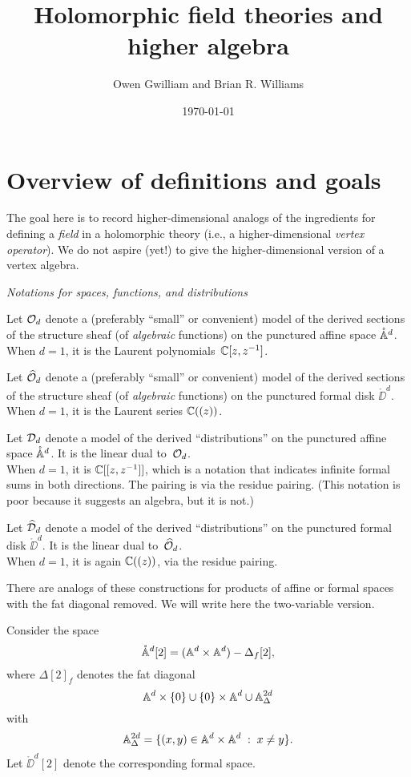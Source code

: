 \documentclass[11pt]{amsart}
\author{Owen Gwilliam and Brian R. Williams}
\date{\today}
\title{Holomorphic field theories and higher algebra}
\begin{document}
\section{Overview of definitions and goals}

The goal here is to record higher-dimensional analogs of the ingredients for defining a {\em field} in a holomorphic theory (i.e., a higher-dimensional {\em vertex operator}). We do not aspire (yet!) to give the higher-dimensional version of a vertex algebra.

{\it Notations for spaces, functions, and distributions}

Let $\cO_d$ denote a (preferably ``small'' or convenient) model of the derived sections of the structure sheaf (of {\em algebraic} functions) on the punctured affine space $\mathring{\AA}^d$.\\
{\tiny When $d=1$, it is the Laurent polynomials~$\CC[z,z^{-1}]$.}

Let $\widehat{\cO}_d$ denote a (preferably ``small'' or convenient) model of the derived sections of the structure sheaf (of {\em algebraic} functions) on the punctured formal disk $\mathring{\DD}^d$.\\
{\tiny When $d=1$, it is the Laurent series $\CC((z))$.}

Let $\cD_d$ denote a model of the derived ``distributions'' on the punctured affine space $\mathring{\AA}^d$. It is the linear dual to~$\cO_d$.\\
{\tiny When $d=1$, it is $\CC[[z,z^{-1}]]$, which is a notation that indicates infinite formal sums in both directions. The pairing is via the residue pairing. (This notation is poor because it suggests an algebra, but it is not.)}

Let $\widehat{\cD}_d$ denote a model of the derived ``distributions'' on the punctured formal disk $\mathring{\DD}^d$. It is the linear dual to~$\widehat{\cO}_d$.\\
{\tiny When $d=1$, it is again $\CC((z))$, via the residue pairing.}

There are analogs of these constructions for products of affine or formal spaces with the fat diagonal removed.
We will write here the two-variable version.

Consider the space 
\[
\mathring{\AA}^{d}[2]= (\AA^d \times \AA^d) - \Delta_f{[2]}, 
\]
where $\Delta[2]_f$ denotes the fat diagonal
\[
\AA^d \times \{0\} \cup \{0\} \times \AA^d \cup \AA^{2d}_\Delta
\]
with
\[
 \AA^{2d}_\Delta = \{ (x,y) \in \AA^d \times \AA^d \; : \; x \neq y\}.
\]
Let $\mathring{\DD}^d[2]$ denote the corresponding formal space.
\end{document}
